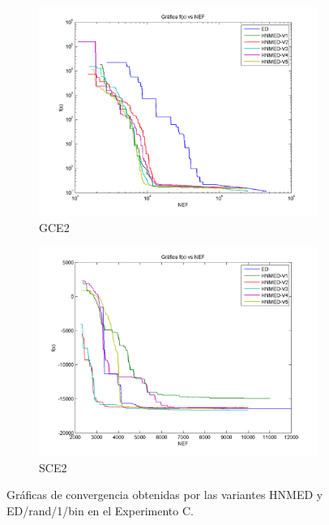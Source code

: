 \begin{figure}
\begin{subfigure}[b]{0.49\linewidth}
		\includegraphics[width=\linewidth]{Figures/C-Grafica_Convergencia_Problema_5}
		\caption{GCE2} \label{fig:G2} 
	\end{subfigure}
	\begin{subfigure}[b]{0.49\linewidth}
		\includegraphics[width=\linewidth]{Figures/C-Grafica_Convergencia_Problema_6}
		\caption{SCE2} \label{fig:S1} 
	\end{subfigure}
	\caption{Gráficas de convergencia obtenidas por las variantes HNMED y ED/rand/1/bin en el Experimento C.} \label{fig: Gráficas de convergencia para las variantes HNMED y ED/rand/1/bin para el Experimento C} 
	
\end{figure}
